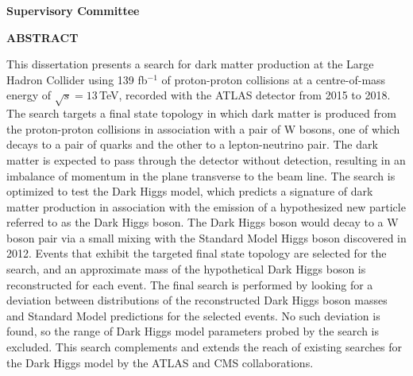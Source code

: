 \newpage
{}

\noindent \textbf{Supervisory Committee}
\tpbreak
\panel %

\newpage

\begin{center}
\textbf{ABSTRACT}
\end{center}

This dissertation presents a search for dark matter production at the Large Hadron Collider using 139 fb\(^{-1}\) of proton-proton collisions at a centre-of-mass energy of \(\sqrt{s} = 13\,\)TeV, recorded with the ATLAS detector from 2015 to 2018. The search targets a final state topology in which dark matter is produced from the proton-proton collisions in association with a pair of W bosons, one of which decays to a pair of quarks and the other to a lepton-neutrino pair. The dark matter is expected to pass through the detector without detection, resulting in an imbalance of momentum in the plane transverse to the beam line. 
The search is optimized to test the Dark Higgs model, which predicts a signature of dark matter production in association with the emission of a hypothesized new particle referred to as the Dark Higgs boson. The Dark Higgs boson would decay to a W boson pair  via a small mixing with the Standard Model Higgs boson discovered in 2012. Events that exhibit the targeted final state topology are selected for the search, and an approximate mass of the hypothetical Dark Higgs boson is reconstructed for each event. The final search is performed by looking for a deviation between distributions of the reconstructed Dark Higgs boson masses and Standard Model predictions for the selected events. No such deviation is found, so the range of Dark Higgs model parameters probed by the search is excluded. This search complements and extends the reach of existing searches for the Dark Higgs model by the ATLAS and CMS collaborations.




